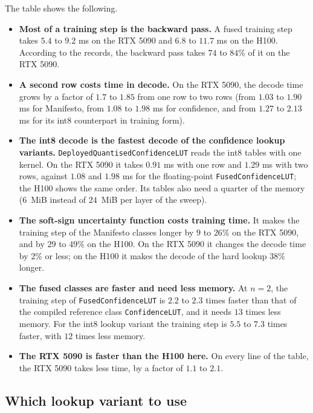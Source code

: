 \documentclass[11pt]{article}
\DeclareRobustCommand{\code}[1]{{\renewcommand{\_}{\textunderscore\allowbreak}\texttt{#1}}}
\newcommand{\needlines}[1]{\par\ifdim\dimexpr\pagegoal-\pagetotal\relax<#1\baselineskip \newpage\fi}
\begin{document}
\needlines{5}
The table shows the following.
\begin{itemize}\itemsep0pt
\item \textbf{Most of a training step is the backward pass.} A fused training step takes $5.4$ to $9.2$
  ms on the RTX 5090 and $6.8$ to $11.7$ ms on the H100. According to the records, the backward pass takes
  $74$ to $84\%$ of it on the RTX 5090.
\item \textbf{A second row costs time in decode.} On the RTX 5090, the decode time grows by a factor of
  $1.7$ to $1.85$ from one row to two rows (from $1.03$ to $1.90$ ms for Manifesto, from $1.08$ to $1.98$
  ms for confidence, and from $1.27$ to $2.13$ ms for its int8 counterpart in training form).
\item \textbf{The int8 decode is the fastest decode of the confidence lookup variants.}
  \code{DeployedQuantisedConfidenceLUT} reads the int8 tables with one kernel. On the RTX 5090 it takes
  $0.91$ ms with one row and $1.29$ ms with two rows, against $1.08$ and $1.98$ ms for the floating-point
  \code{FusedConfidenceLUT}; the H100 shows the same order. Its tables also need a quarter of the memory
  ($6$~MiB instead of $24$~MiB per layer of the sweep).
\item \textbf{The soft-sign uncertainty function costs training time.} It makes the training step of the
  Manifesto classes longer by $9$ to $26\%$ on the RTX 5090, and by $29$ to $49\%$ on the H100. On the
  RTX 5090 it changes the decode time by $2\%$ or less; on the H100 it makes the decode of the hard lookup
  $38\%$ longer.
\item \textbf{The fused classes are faster and need less memory.} At $n=2$, the training step of
  \code{FusedConfidenceLUT} is $2.2$ to $2.3$ times faster than that of the compiled reference class
  \code{ConfidenceLUT}, and it needs $13$ times less memory. For the int8 lookup variant the training step
  is $5.5$ to $7.3$ times faster, with $12$ times less memory.
\item \textbf{The RTX 5090 is faster than the H100 here.} On every line of the table, the RTX 5090 takes
  less time, by a factor of $1.1$ to $2.1$.
\end{itemize}

\subsection{Which lookup variant to use}
\label{sec:which}
\end{document}
